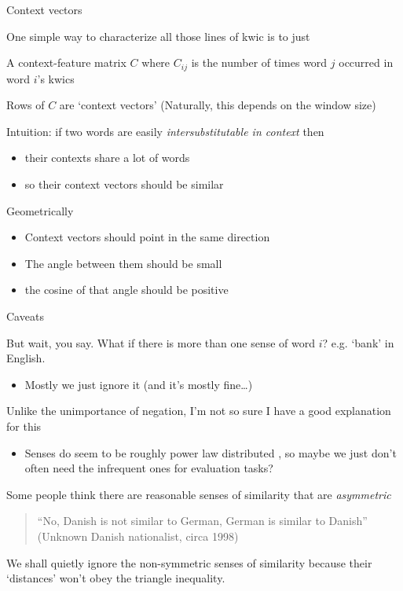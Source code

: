 \documentclass{hertieteaching}
\begin{document}
\begin{frame}[fragile]{Context vectors}

One simple way to characterize all those lines of kwic is to just  

A context-feature matrix $C$ where $C_\mathit{ij}$ is the number of times word $j$ occurred in word $i$'s kwics

Rows of $C$ are `context vectors' (Naturally, this depends on the window size)

Intuition: if two words are easily \textit{intersubstitutable in context} then 
\begin{itemize}
  \item their contexts share a lot of words
  \item so their context vectors should be similar
\end{itemize}

Geometrically
\begin{itemize}
  \item Context vectors should point in the same direction
  \item The angle between them should be small
  \item the cosine of that angle should be positive 
\end{itemize}

\end{frame}
\begin{frame}[fragile]{Caveats}

But wait, you say. What if there is more than one sense of word $i$? e.g. `bank' in English.
\begin{itemize}
  \item Mostly we just ignore it (and it's mostly fine\ldots)
\end{itemize}
Unlike the unimportance of negation, I'm not so sure I have a good explanation for this
\begin{itemize}
  \item Senses do seem to be roughly power law distributed \parencite{Zipf1945}, so maybe we just don't often need the infrequent ones for evaluation tasks?
\end{itemize}

\pause

Some people think there are reasonable senses of similarity that are \textit{asymmetric}

\smallskip
\begin{quote}
``No, Danish is not similar to German, German is similar to Danish''\\
\hfill (Unknown Danish nationalist, circa 1998)
\end{quote}

We shall quietly ignore the non-symmetric senses of similarity because their `distances' won't obey the triangle inequality.


\end{frame}
\end{document}
